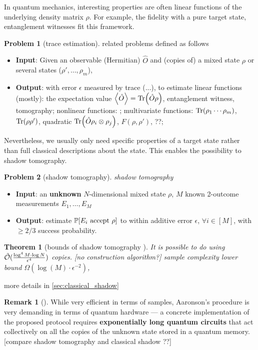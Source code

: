 \documentclass[
aps,
pra,
floatfix,
]{revtex4-2}
\theoremstyle{plain}
\newtheorem{theorem}{Theorem}
\theoremstyle{definition}
\newtheorem{remark}{Remark}
\newtheorem{problem}{Problem}
\newcommand{\ob}{\hat{O}}
\newcommand{\dm}{\rho}
\begin{document}
In quantum mechanics, interesting properties are often linear functions of the underlying density matrix $\dm$.
For example, the fidelity with a pure target state, entanglement witnesses fit this framework.
\begin{problem}[trace estimation]\label{prm:trace_estimation}
	related problems defined as follows
	\begin{itemize}
		\item \textbf{Input}: Given an observable (Hermitian) $\ob$ and (copies of) a mixed state $\dm$ or several states ($\dm',\dots,\dm_m$), 
		\item \textbf{Output}: 
		with error $\epsilon$ measured by trace  (...), to estimate
		linear functions (mostly): the expectation value $\expval{\ob}=\Tr(\ob \dm) $, entanglement witness, tomography; 
		nonlinear functions: ;
		multivariate functions:  $\Tr(\dm_1 \cdots \dm_m)$,  $\Tr(\dm\dm')$,  quadratic $\Tr(\ob \dm_i \otimes \dm_j)$,  $F(\dm,\dm')$, ??;
	\end{itemize}
\end{problem}

Nevertheless, we usually only need specific properties of a target state rather than full classical descriptions about the state.
This enables the possibility to shadow tomography.
\begin{problem}[shadow tomography]\label{prm:shadow_tomography}
	\emph{shadow tomography}
	\begin{itemize}
		\item \textbf{Input}: an \textbf{unknown} $N$-dimensional mixed state $\rho$, $M$ known 2-outcome measurements $E_1,\dots,E_M$
		\item \textbf{Output}: estimate $\probability[E_i \text{ accept } \dm]$ to within additive error $\epsilon$, $\forall i\in [M]$, with $\ge 2/3$ success probability.	
	\end{itemize}
\end{problem}
\begin{theorem}[bounds of shadow tomography \cite{aaronsonShadowTomographyQuantum2018}]\label{thm:shadow_tomography}
	It is possible to do  using $\tilde{\mathcal{O}}(\frac{\log^4 M\cdot \log N}{\epsilon^4})$ copies. [no construction algorithm?]
	sample complexity lower bound $\Omega(\log (M) \cdot \epsilon^{-2})$, 
\end{theorem}
more details in \cref{sec:classical_shadow}
\begin{remark}[\cite{huangPredictingManyProperties2020}]
	While very efficient in terms of samples, Aaronson's procedure is very demanding in terms of quantum hardware — a concrete implementation of the proposed protocol requires \textbf{exponentially long quantum circuits} that act collectively on all the copies of the unknown state stored in a quantum memory.[compare shadow tomography and classical shadow ??]
\end{remark}
\end{document}
